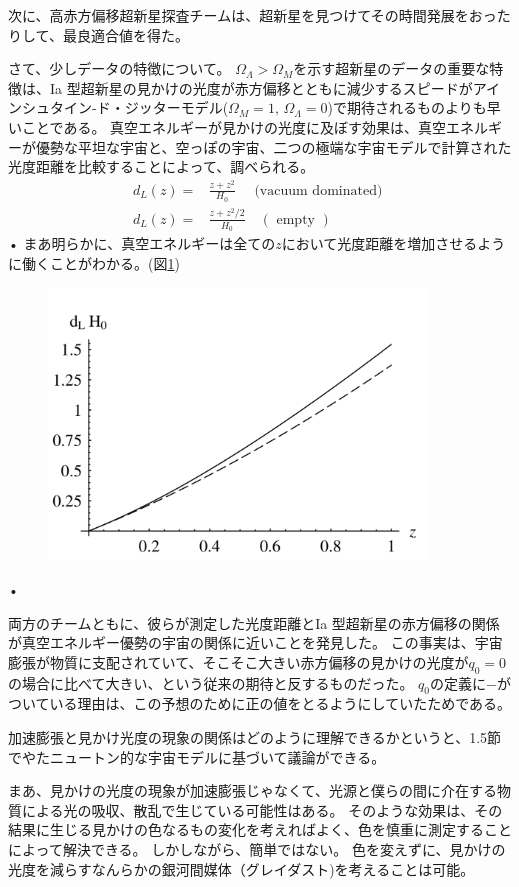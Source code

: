 \documentclass[11pt,a4paper,dvipdfmx]{jsarticle}
\theoremstyle{plain}
\theoremstyle{break}
\begin{document}
次に、高赤方偏移超新星探査チームは、超新星を見つけてその時間発展をおったりして、最良適合値を得た。

さて、少しデータの特徴について。
$\Omega_{\Lambda} > \Omega_{M}$を示す超新星のデータの重要な特徴は、Ia 型超新星の見かけの光度が赤方偏移とともに減少するスピードがアインシュタイン-ド・ジッターモデル($\Omega_{M}=1 , \, \Omega_{\Lambda}  = 0$)で期待されるものよりも早いことである。
真空エネルギーが見かけの光度に及ぼす効果は、真空エネルギーが優勢な平坦な宇宙と、空っぽの宇宙、二つの極端な宇宙モデルで計算された光度距離を比較することによって、調べられる。
\begin{align}
  d_{L}(z)=&\frac{z+z^{2}}{H_{0}} \quad \text { (vacuum dominated) } \\
  d_{L}(z)=&\frac{z+z^{2} / 2}{H_{0}} \quad(\text { empty })
\end{align}•%
まあ明らかに、真空エネルギーは全ての$z$において光度距離を増加させるように働くことがわかる。(図\ref{fig:1-3})
\begin{figure}[h]
	\centering
	\includegraphics[width=10cm]{figure/fig1-3}
	\label{fig:1-3}
	\caption{}
\end{figure}•%

両方のチームともに、彼らが測定した光度距離とIa 型超新星の赤方偏移の関係が真空エネルギー優勢の宇宙の関係に近いことを発見した。
この事実は、宇宙膨張が物質に支配されていて、そこそこ大きい赤方偏移の見かけの光度が$q_0=0$の場合に比べて大きい、という従来の期待と反するものだった。
$q_0$の定義に$-$がついている理由は、この予想のために正の値をとるようにしていたためである。

加速膨張と見かけ光度の現象の関係はどのように理解できるかというと、1.5節でやたニュートン的な宇宙モデルに基づいて議論ができる。

まあ、見かけの光度の現象が加速膨張じゃなくて、光源と僕らの間に介在する物質による光の吸収、散乱で生じている可能性はある。
そのような効果は、その結果に生じる見かけの色なるもの変化を考えればよく、色を慎重に測定することによって解決できる。
しかしながら、簡単ではない。
色を変えずに、見かけの光度を減らすなんらかの銀河間媒体（グレイダスト)を考えることは可能。
\end{document}
